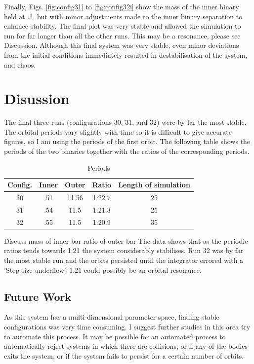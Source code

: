 \documentclass[a4paper,12pt]{article}
\begin{document}
Finally, Figs. \ref{fig:config31} to \ref{fig:config32i} show the mass of the inner binary held at .1, but with minor adjustments made to the inner binary separation to enhance stability.
The final plot was very stable and allowed the simulation to run for far longer than all the other runs. This may be a resonance, please see Discussion. Although this final system was
very stable, even minor deviations from the initial conditions immediately resulted in destabilisation of the system, and chaos.

\newpage
\section{Disussion}
The final three runs (configurations 30, 31, and 32) were by far the most stable. The orbital periods vary slightly with time so it is difficult to give accurate figures, so
I am using the periods of the first orbit. The following table shows the periods of the two binaries together with the ratios of the corresponding periods.
\begin{table}[ht!]
  \centering
  \caption{Periods}
  \label{tab:periods}
  \begin{tabular}{ccccc}
   Config. & Inner & Outer & Ratio & Length of simulation\\
    \hline
   30 & .51 & 11.56 & 1:22.7 & 25\\
   31 & .54 & 11.5 & 1:21.3 & 25\\
   32 & .55 & 11.5 & 1:20.9 & 35\\
  \end{tabular}
\end{table}
Discuss mass of inner bar ratio of outer bar
The data shows that as the periodic ratios tends towards 1:21 the system considerably stabilises. Run 32 was by far the most stable run and the orbits persisted until the integrator
errored with a 'Step size underflow'. 1:21 could possibly be an orbital resonance.

\subsection{Future Work}
As this system has a multi-dimensional parameter space, finding stable configurations was very time consuming. I suggest further studies in this area try to automate this process.
It may be possible for an automated process to automatically reject systems in which there are collisions, or if any of the bodies exits the system, or if the system fails 
to persist for a certain number of orbits.
\end{document}

